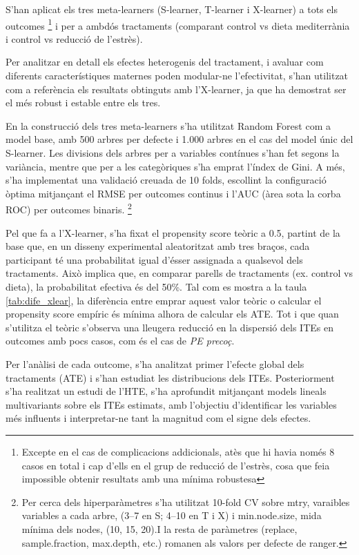\documentclass[../main.tex]{subfiles}
\begin{document}
    S’han aplicat els tres meta-learners (S-learner, T-learner i X-learner) a tots els outcomes \footnote{Excepte en el cas de complicacions addicionals, atès que hi havia només 8 casos en total i cap d’ells en el grup de reducció de l’estrès, cosa que feia impossible obtenir resultats amb una mínima robustesa} i per a ambdós tractaments (comparant control vs dieta mediterrània i control vs reducció de l’estrès).\par
    Per analitzar en detall els efectes heterogenis del tractament, i avaluar com diferents característiques maternes poden modular-ne l’efectivitat, s’han utilitzat com a referència els resultats obtinguts amb l’X-learner, ja que ha demostrat ser el més robust i estable entre els tres. \par
    En la construcció dels tres meta-learners s’ha utilitzat Random Forest com a model base, amb 500 arbres per defecte i 1.000 arbres en el cas del model únic del S-learner. Les divisions dels arbres per a variables contínues s’han fet segons la variància, mentre que per a les categòriques s’ha emprat l’índex de Gini. A més, s’ha implementat una validació creuada de 10 folds, escollint la configuració òptima mitjançant el RMSE per outcomes continus i l’AUC (àrea sota la corba ROC) per outcomes binaris.  \footnote{Per cerca dels hiperparàmetres s'ha utilitzat 10-fold CV sobre mtry, varaibles variables a cada arbre, (3–7 en S; 4–10 en T i X) i min.node.size, mida mínima dels nodes, (10, 15, 20).I la resta de paràmetres (replace, sample.fraction, max.depth, etc.) romanen als valors per defecte de ranger.}\par
    Pel que fa a l’X-learner, s’ha fixat el propensity score teòric a 0.5, partint de la base que, en un disseny experimental aleatoritzat amb tres braços, cada participant té una probabilitat igual d’ésser assignada a qualsevol dels tractaments. Això implica que, en comparar parells de tractaments (ex. control vs dieta), la probabilitat efectiva és del 50\%. Tal com es mostra a la taula \ref{tab:dife_xlear}, la diferència entre emprar aquest valor teòric o calcular el propensity score empíric és mínima alhora de calcular els ATE. Tot i que quan s'utilitza el teòric s’observa una lleugera reducció en la dispersió dels ITEs en outcomes amb pocs casos, com és el cas de \textit{PE precoç}.\par
    Per l'anàlisi de cada outcome, s’ha analitzat primer l’efecte global dels tractaments (ATE) i s'han estudiat les distribucions dels ITEs. Posteriorment s’ha realitzat un estudi de l’HTE, s’ha aprofundit mitjançant models lineals multivariants sobre els ITEs estimats, amb l’objectiu d’identificar les variables més influents i interpretar-ne tant la magnitud com el signe dels efectes.
\end{document}
